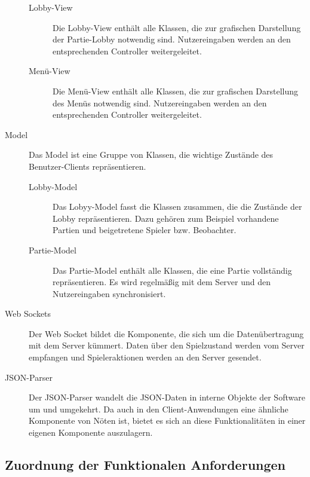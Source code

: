 \begin{description}
\begin{description}
			
				\item[Lobby-View]
				Die Lobby-View enthält alle Klassen, die zur grafischen Darstellung der Partie-Lobby notwendig sind. Nutzereingaben werden an den entsprechenden Controller weitergeleitet.
			
			
				\item[Menü-View]
				Die Menü-View enthält alle Klassen, die zur grafischen Darstellung des Menüs notwendig sind. Nutzereingaben werden an den entsprechenden Controller weitergeleitet.

			\end{description}
			
			
			
			\item[Model]
			Das Model ist eine Gruppe von Klassen, die wichtige Zustände des Benutzer-Clients repräsentieren.
			
			\begin{description}
				\item[Lobby-Model]
				Das Lobyy-Model fasst die Klassen zusammen, die die Zustände der Lobby repräsentieren. Dazu gehören zum Beispiel vorhandene Partien und beigetretene Spieler bzw. Beobachter.
			
				\item[Partie-Model]
				Das Partie-Model enthält alle Klassen, die eine Partie vollständig repräsentieren. Es wird regelmäßig mit dem Server und den Nutzereingaben synchronisiert.
			\end{description}
			
			\item[Web Sockets]
			Der Web Socket bildet die Komponente, die sich um die Datenübertragung mit dem Server kümmert. Daten über den Spielzustand werden vom Server empfangen und Spieleraktionen werden an den Server gesendet.
			
			\item[JSON-Parser]
			Der JSON-Parser wandelt die JSON-Daten in interne Objekte der Software um und umgekehrt. Da auch in den Client-Anwendungen eine ähnliche Komponente von Nöten ist, bietet es sich an diese Funktionalitäten in einer eigenen Komponente auszulagern.  

		\end{description}
		
	\subsection{Zuordnung der Funktionalen Anforderungen}
	
